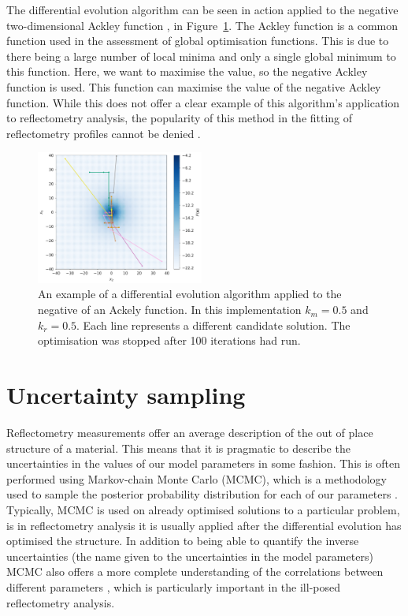 \documentclass[
 reprint,
 superscriptaddress,
 amsmath,amssymb,
 aps,
]{revtex4-2}
\begin{document}
The differential evolution algorithm can be seen in action applied to the negative two-dimensional Ackley function \cite{ackley_connectionist_1987}, in Figure~\ref{fig:ackley}.
The Ackley function is a common function used in the assessment of global optimisation functions. This is due to there being a large number of local minima and only a single global minimum to this function. Here, we want to maximise the value, so the negative Ackley function is used.
This function can maximise the value of the negative Ackley function.
While this does not offer a clear example of this algorithm's application to reflectometry analysis, the popularity of this method in the fitting of reflectometry profiles cannot be denied \cite{bjorck_fitting_2011,nelson_refnx_2019}.
%
\begin{figure}[t]
    \forcerectofloat
    \includegraphics[width=0.49\textwidth]{ackley}
    \caption{An example of a differential evolution algorithm applied to the negative of an Ackely function. In this implementation $k_m=0.5$ and $k_r=0.5$. Each line represents a different candidate solution. The optimisation was stopped after 100 iterations had run.}
    \label{fig:ackley}
\end{figure}
%

\section{Uncertainty sampling}
Reflectometry measurements offer an average description of the out of place structure of a material. 
This means that it is pragmatic to describe the uncertainties in the values of our model parameters in some fashion. 
This is often performed using Markov-chain Monte Carlo (MCMC), which is a methodology used to sample the posterior probability distribution for each of our parameters \cite{sivia_data_2006}.
Typically, MCMC is used on already optimised solutions to a particular problem, is in reflectometry analysis it is usually applied after the differential evolution has optimised the structure. 
In addition to being able to quantify the inverse uncertainties (the name given to the uncertainties in the model parameters) MCMC also offers a more complete understanding of the correlations between different parameters \cite{gilks_markov_1995}, which is particularly important in the ill-posed reflectometry analysis. 
\end{document}
